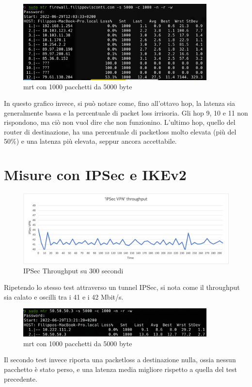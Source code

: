 \begin{figure}[ht]
    \centering
    \includegraphics[width=10cm]{figure/mrt_16min_noVPN.png}
    \caption{mrt con 1000 pacchetti da 5000 byte}
\end{figure}

In questo grafico invece, si può notare come, fino all'ottavo hop, la latenza sia generalmente bassa e la percentuale di packet loss irrisoria. Gli hop 9, 10 e 11 non rispondono, ma ciò non vuol dire che non funzionino. L'ultimo hop, quello del router di destinazione, ha una percentuale di packetloss molto elevata (più del 50\%) e una latenza più elevata, seppur ancora accettabile.

\section{Misure con IPSec e IKEv2}
\begin{figure}[ht]
    \centering
    \includegraphics[width=12cm]{figure/vpn_thr.png-2.png}
    \caption{IPSec Throughput su 300 secondi}
\end{figure}
Ripetendo lo stesso test attraverso un tunnel IPSec, si nota come il throughput sia calato e oscilli tra i 41 e i 42 Mbit/s.

\begin{figure}[ht]
    \centering
    \includegraphics[width=10cm]{figure/mtr_16min_ipsec.png}
    \caption{mrt con 1000 pacchetti da 5000 byte}
\end{figure}
Il secondo test invece riporta una packetloss a destinazione nulla, ossia nessun pacchetto è stato perso, e una latenza media migliore rispetto a quella del test precedente.


